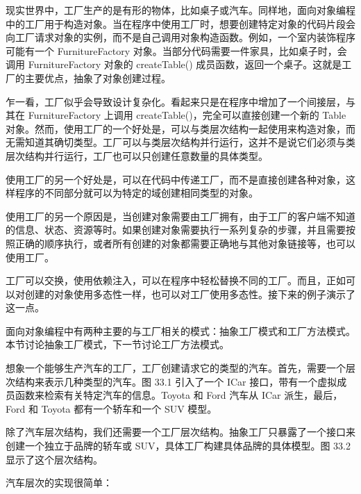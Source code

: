 
现实世界中，工厂生产的是有形的物体，比如桌子或汽车。同样地，面向对象编程中的工厂用于构造对象。当在程序中使用工厂时，想要创建特定对象的代码片段会向工厂请求对象的实例，而不是自己调用对象构造函数。例如，一个室内装饰程序可能有一个 FurnitureFactory 对象。当部分代码需要一件家具，比如桌子时，会调用 FurnitureFactory 对象的 createTable() 成员函数，返回一个桌子。这就是工厂的主要优点，抽象了对象创建过程。

乍一看，工厂似乎会导致设计复杂化。看起来只是在程序中增加了一个间接层，与其在 FurnitureFactory 上调用 createTable()，完全可以直接创建一个新的 Table 对象。然而，使用工厂的一个好处是，可以与类层次结构一起使用来构造对象，而无需知道其确切类型。工厂可以与类层次结构并行运行，这并不是说它们必须与类层次结构并行运行，工厂也可以只创建任意数量的具体类型。

使用工厂的另一个好处是，可以在代码中传递工厂，而不是直接创建各种对象，这样程序的不同部分就可以为特定的域创建相同类型的对象。

使用工厂的另一个原因是，当创建对象需要由工厂拥有，由于工厂的客户端不知道的信息、状态、资源等时。如果创建对象需要执行一系列复杂的步骤，并且需要按照正确的顺序执行，或者所有创建的对象都需要正确地与其他对象链接等，也可以使用工厂。

工厂可以交换，使用依赖注入，可以在程序中轻松替换不同的工厂。而且，正如可以对创建的对象使用多态性一样，也可以对工厂使用多态性。接下来的例子演示了这一点。

面向对象编程中有两种主要的与工厂相关的模式：抽象工厂模式和工厂方法模式。本节讨论抽象工厂模式，下一节讨论工厂方法模式。


想象一个能够生产汽车的工厂，工厂创建请求它的类型的汽车。首先，需要一个层次结构来表示几种类型的汽车。图 33.1 引入了一个 ICar 接口，带有一个虚拟成员函数来检索有关特定汽车的信息。Toyota 和 Ford 汽车从 ICar 派生，最后，Ford 和 Toyota 都有一个轿车和一个 SUV 模型。


除了汽车层次结构，我们还需要一个工厂层次结构。抽象工厂只暴露了一个接口来创建一个独立于品牌的轿车或 SUV，具体工厂构建具体品牌的具体模型。图 33.2 显示了这个层次结构。



汽车层次的实现很简单：

